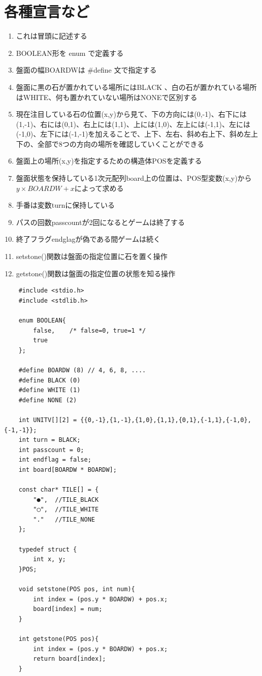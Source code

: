 \documentclass[uplatex,a4paper,11pt,oneside,openany]{jsarticle}
\begin{document}
\newpage

\section{各種宣言など}

\begin{enumerate}
\item これは冒頭に記述する
\item BOOLEAN形を enum で定義する
\item 盤面の幅BOARDWは \#define 文で指定する
\item 盤面に黒の石が置かれている場所にはBLACK 、白の石が置かれている場所はWHITE、何も置かれていない場所はNONEで区別する
\item 現在注目している石の位置(x,y)から見て、下の方向には(0,-1)、右下には(1,-1)、右には(0,1)、右上には(1,1)、上には(1,0)、左上には(-1,1)、左には(-1,0)、左下には(-1,-1)を加えることで、上下、左右、斜め右上下、斜め左上下の、全部で8つの方向の場所を確認していくことができる
\item 盤面上の場所(x,y)を指定するための構造体POSを定義する
\item 盤面状態を保持している1次元配列board上の位置は、POS型変数(x,y)から\\$y \times BOARDW +x$によって求める
\item 手番は変数turnに保持している
\item パスの回数passcountが2回になるとゲームは終了する
\item 終了フラグendglagが偽である間ゲームは続く
\item setstone()関数は盤面の指定位置に石を置く操作
\item getstone()関数は盤面の指定位置の状態を知る操作
\end{enumerate}

\begin{lstlisting}
	#include <stdio.h>
	#include <stdlib.h>
	
	enum BOOLEAN{
		false,    /* false=0, true=1 */
		true
	};
	
	#define BOARDW (8) // 4, 6, 8, ....
	#define BLACK (0)
	#define WHITE (1)
	#define NONE (2)
	
	int UNITV[][2] = {{0,-1},{1,-1},{1,0},{1,1},{0,1},{-1,1},{-1,0},{-1,-1}};
	int turn = BLACK;
	int passcount = 0;
	int endflag = false;
	int board[BOARDW * BOARDW];
	
	const char* TILE[] = {
		"●",  //TILE_BLACK
		"◯",  //TILE_WHITE
		"."   //TILE_NONE
	};
	
	typedef struct {
		int x, y;
	}POS;
	
	void setstone(POS pos, int num){
		int index = (pos.y * BOARDW) + pos.x;
		board[index] = num;
	}
	
	int getstone(POS pos){
		int index = (pos.y * BOARDW) + pos.x;
		return board[index];
	}
\end{lstlisting}
\end{document}
